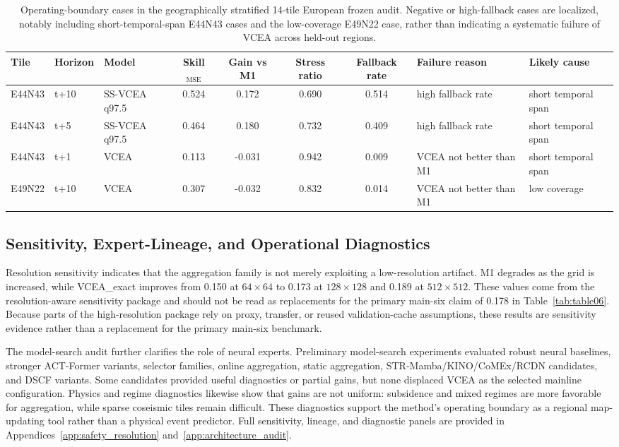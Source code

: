 \documentclass[lettersize,journal]{IEEEtran}
\begin{document}
\begin{table}[!t]
\centering
\scriptsize
\begin{adjustbox}{max width=\textwidth}
\begin{tabular}{lllccccll}
\toprule
Tile & Horizon & Model & Skill$_{\mathrm{MSE}}$ & Gain vs M1 & Stress ratio & Fallback rate & Failure reason & Likely cause \\
\midrule
E44N43 & t+10 & SS-VCEA q97.5 & 0.524 & 0.172 & 0.690 & 0.514 & high fallback rate & short temporal span \\
E44N43 & t+5 & SS-VCEA q97.5 & 0.464 & 0.180 & 0.732 & 0.409 & high fallback rate & short temporal span \\
E44N43 & t+1 & VCEA & 0.113 & -0.031 & 0.942 & 0.009 & VCEA not better than M1 & short temporal span \\
E49N22 & t+10 & VCEA & 0.307 & -0.032 & 0.832 & 0.014 & VCEA not better than M1 & low coverage \\
\bottomrule
\end{tabular}
\end{adjustbox}
\caption{Operating-boundary cases in the geographically stratified 14-tile European frozen audit. Negative or high-fallback cases are localized, notably including short-temporal-span E44N43 cases and the low-coverage E49N22 case, rather than indicating a systematic failure of VCEA across held-out regions.}
\label{tab:e7_strong_failure_cases}
\end{table}

\subsection{Sensitivity, Expert-Lineage, and Operational Diagnostics}
Resolution sensitivity indicates that the aggregation family is not merely exploiting a low-resolution artifact. M1 degrades as the grid is increased, while VCEA\_exact improves from 0.150 at $64\times64$ to 0.173 at $128\times128$ and 0.189 at $512\times512$. These values come from the resolution-aware sensitivity package and should not be read as replacements for the primary main-six claim of 0.178 in Table~\ref{tab:table06}. Because parts of the high-resolution package rely on proxy, transfer, or reused validation-cache assumptions, these results are sensitivity evidence rather than a replacement for the primary main-six benchmark.

The model-search audit further clarifies the role of neural experts. Preliminary model-search experiments evaluated robust neural baselines, stronger ACT-Former variants, selector families, online aggregation, static aggregation, STR-Mamba/KINO/CoMEx/RCDN candidates, and DSCF variants. Some candidates provided useful diagnostics or partial gains, but none displaced VCEA as the selected mainline configuration. Physics and regime diagnostics likewise show that gains are not uniform: subsidence and mixed regimes are more favorable for aggregation, while sparse coseismic tiles remain difficult. These diagnostics support the method's operating boundary as a regional map-updating tool rather than a physical event predictor. Full sensitivity, lineage, and diagnostic panels are provided in Appendices~\ref{app:safety_resolution} and~\ref{app:architecture_audit}.
\end{document}
